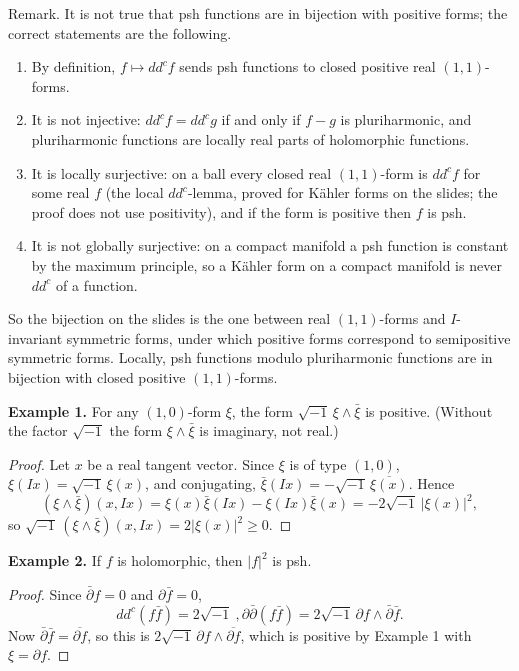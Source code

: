 Remark. It is not true that psh functions
are in bijection with positive forms; the
correct statements are the following.
\begin{enumerate}
\item By definition, $f\mapsto dd^cf$ sends
psh functions to closed positive real
$(1,1)$-forms. \item It is not injective:
$dd^cf=dd^cg$ if and only if $f-g$ is
pluriharmonic, and pluriharmonic functions
are locally real parts of holomorphic
functions. \item It is locally surjective: on
a ball every closed real $(1,1)$-form is
$dd^cf$ for some real $f$ (the local
$dd^c$-lemma, proved for K\"ahler forms on
the slides; the proof does not use
positivity), and if the form is positive then
$f$ is psh. \item It is not globally
surjective: on a compact manifold a psh
function is constant by the maximum
principle, so a K\"ahler form on a compact
manifold is never $dd^c$ of a function.
\end{enumerate}
So the bijection on the slides is the one
between real $(1,1)$-forms and $I$-invariant
symmetric forms, under which positive forms
correspond to semipositive symmetric forms.
Locally, psh functions modulo pluriharmonic
functions are in bijection with closed
positive $(1,1)$-forms.

\medskip\noindent
{\bf Example 1.} For any $(1,0)$-form $\xi$,
the form $\sqrt{-1}\,\xi\wedge\bar\xi$ is
positive. (Without the factor
$\sqrt{-1}$ the form $\xi\wedge\bar\xi$ is
imaginary, not real.)

\begin{proof}
Let $x$ be a real tangent vector. Since $\xi$
is of type $(1,0)$,
$\xi(Ix)=\sqrt{-1}\,\xi(x)$, and conjugating,
$\bar\xi(Ix)=-\sqrt{-1}\,\overline{\xi(x)}$.
Hence
$$
(\xi\wedge\bar\xi)(x,Ix)
=\xi(x)\bar\xi(Ix)-\xi(Ix)\bar\xi(x)
=-2\sqrt{-1}\,|\xi(x)|^2,
$$
so
$\sqrt{-1}\,(\xi\wedge\bar\xi)(x,Ix)
=2|\xi(x)|^2\geq
0$.
\end{proof}

\medskip\noindent
{\bf Example 2.} If $f$ is holomorphic, then
$|f|^2$ is psh.

\begin{proof}
Since $\bar\partial f=0$ and $\partial\bar
f=0$,
$$
dd^c(f\bar f)=2\sqrt{-1}\
,\partial\bar\partial(f\bar f)
=2\sqrt{-1}\,\partial f
\wedge\bar\partial\bar f .
$$
Now $\bar\partial\bar f=\overline{\partial
f}$, so this is $2\sqrt{-1}\,\partial
f\wedge\overline{\partial f}$, which is
positive by Example 1 with $\xi=\partial f$.
\end{proof}

